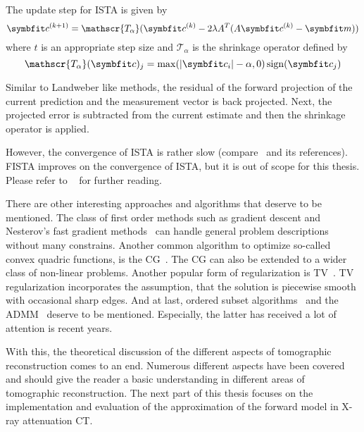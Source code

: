 \begin{definition}[ISTA]\label{def:ista}
	The update step for \gls{ISTA} is given by
	\[
		\mvec{c}^{(k+1)} = \mathscr{T_\alpha} (\mvec{c}^{(k)} - 2 \lambda A^T (A \mvec{c}^{(k)} - \mvec{m}))
	\]
	where \(t\) is an appropriate step size and \(\mathscr{T_\alpha}\) is the shrinkage operator
	defined by
	\[
		\mathscr{T_\alpha}(\mvec{c})_j = \max(\abs{\mvec{c}_i} - \alpha, 0) \sign(\mvec{c}_j)
	\]
\end{definition}
Similar to Landweber like methods, the residual of the forward projection of the current prediction
and the measurement vector is back projected. Next, the projected error is subtracted from the
current estimate and then the shrinkage operator is applied.

However, the convergence of \gls{ISTA} is rather slow (compare~\cite{beck_fast_2009} and its
references). \gls{FISTA} improves on the convergence of \gls{ISTA}, but it is out of scope for this
thesis. Please refer to \citeauthor{beck_fast_2009}~\cite{beck_fast_2009} for further reading.

There are other interesting approaches and algorithms that deserve to be mentioned. The class of
first order methods such as gradient descent and Nesterov’s fast gradient
methods~\cite{kim_optimized_2016} can handle general problem descriptions without many constrains.
Another common algorithm to optimize so-called convex quadric functions, is the
\gls{CG}~\cite{shewchuk_introduction_1994}. The \gls{CG} can also be extended to a wider class of
non-linear problems. Another popular form of regularization is
\gls{TV}~\cite{rudin_nonlinear_1992,hansen_total_2011}. \gls{TV} regularization incorporates the
assumption, that the solution is piecewise smooth with occasional sharp edges. And at last, ordered
subset algorithms~\cite{hudson_accelerated_1994,erdogan_ordered_1999} and the
\gls{ADMM}~\cite{boyd_distributed_2010} deserve to be mentioned. Especially, the latter has received
a lot of attention is recent years.

With this, the theoretical discussion of the different aspects of tomographic reconstruction comes
to an end. Numerous different aspects have been covered and should give the reader a basic
understanding in different areas of tomographic reconstruction. The next part of this thesis focuses
on the implementation and evaluation of the approximation of the forward model in X-ray attenuation
CT\@.
